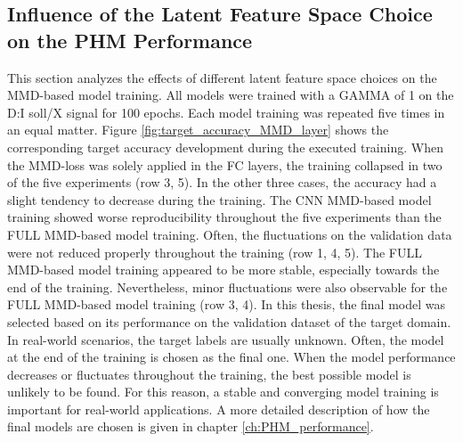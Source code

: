 \subsection{Influence of the Latent Feature Space Choice on the PHM Performance}\label{ch:Influence_Layer_real_dataset}
This section analyzes the effects of different latent feature space choices on the MMD-based model training. All models were trained with a GAMMA of 1 on the D:I soll/X signal for 100 epochs. Each model training was repeated five times in an equal matter. Figure \ref{fig:target_accuracy_MMD_layer} shows the corresponding target accuracy development during the executed training. When the MMD-loss was solely applied in the FC layers, the training collapsed in two of the five experiments (row 3, 5). In the other three cases, the accuracy had a slight tendency to decrease during the training. The CNN MMD-based model training showed worse reproducibility throughout the five experiments than the FULL MMD-based model training. Often, the fluctuations on the validation data were not reduced properly throughout the training (row 1, 4, 5). The FULL MMD-based model training appeared to be more stable, especially towards the end of the training. Nevertheless, minor fluctuations were also observable for the FULL MMD-based model training (row 3, 4). In this thesis, the final model was selected based on its performance on the validation dataset of the target domain. In real-world scenarios, the target labels are usually unknown. Often, the model at the end of the training is chosen as the final one. When the model performance decreases or fluctuates throughout the training, the best possible model is unlikely to be found. For this reason, a stable and converging model training is important for real-world applications. A more detailed description of how the final models are chosen is given in chapter \ref{ch:PHM_performance}. 

